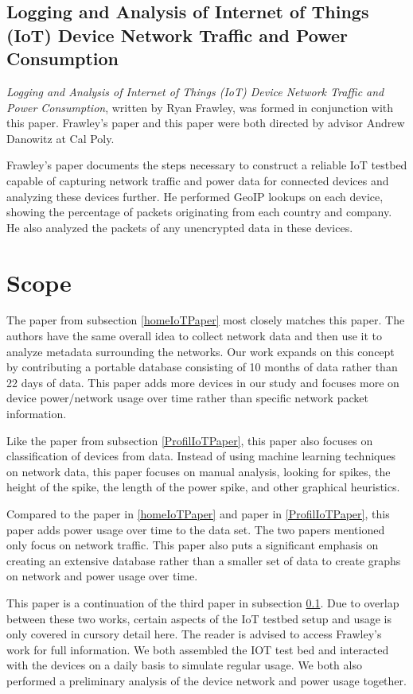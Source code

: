 \subsection{Logging and Analysis of Internet of Things (IoT) Device Network Traffic and Power Consumption}
\label{frawleyPaper}
\textit{Logging and Analysis of Internet of Things (IoT) Device Network Traffic and Power Consumption}\cite{frawley_2018}, written by Ryan Frawley, was formed in conjunction with this paper. Frawley's paper and this paper were both directed by advisor Andrew Danowitz at Cal Poly.

Frawley's paper documents the steps necessary to construct a reliable IoT testbed capable of capturing network traffic and power data for connected devices and analyzing these devices further. He performed GeoIP\cite{maxmind} lookups on each device, showing the percentage of packets originating from each country and company. He also analyzed the packets of any unencrypted data in these devices.

\section{Scope}
\label{Scope}
The paper from subsection \ref{homeIoTPaper} most closely matches this paper. The authors have the same overall idea to collect network data and then use it to analyze metadata surrounding the networks. Our work expands on this concept by contributing a portable database consisting of 10 months of data rather than 22 days of data. This paper adds more devices in our study and focuses more on device power/network usage over time rather than specific network packet information.

Like the paper from subsection \ref{ProfilIoTPaper}, this paper also focuses on classification of devices from data. Instead of using machine learning techniques on network data, this paper focuses on manual analysis, looking for spikes, the height of the spike, the length of the power spike, and other graphical heuristics.

Compared to the paper in \ref{homeIoTPaper} and paper in \ref{ProfilIoTPaper}, this paper adds power usage over time to the data set. The two papers mentioned only focus on network traffic. This paper also puts a significant emphasis on creating an extensive database rather than a smaller set of data to create graphs on network and power usage over time.

This paper is a continuation of the third paper in subsection \ref{frawleyPaper}. Due to overlap between these two works, certain aspects of the IoT testbed setup and usage is only covered in cursory detail here. The reader is advised to access Frawley's work for full information. We both assembled the IOT test bed and interacted with the devices on a daily basis to simulate regular usage. We both also performed a preliminary analysis of the device network and power usage together.

